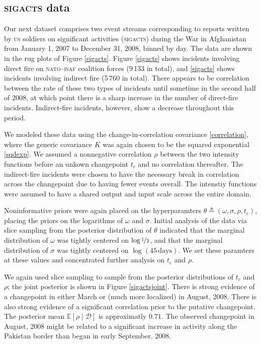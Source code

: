 \documentclass{article}
\newcommand{\deq}{\triangleq}
\newcommand{\cm}[1]{\mathcal{#1}}
\newcommand{\data}{\cm{D}}
\newcommand{\given}{\mid}
\begin{document}
\subsection{\textsc{sigacts} data}

Our next dataset comprises two event streams corresponding to reports
written by \textsc{us} soldiers on significant activities
(\textsc{sigacts}) during the War in Afghanistan from January 1, 2007
to December 31, 2008, binned by day.  The data are shown in the rug
plots of Figure \ref{sigacts}.  Figure \ref{sigacts}
shows incidents involving direct fire on \textsc{nato}--\textsc{isaf}
coalition forces (9\,133 in total), and \ref{sigacts}
shows incidents involving indirect fire (5\,760 in total).  There
appears to be correlation between the rate of these two types of
incidents until sometime in the second half of 2008, at which point
there is a sharp increase in the number of direct-fire incidents.
Indirect-fire incidents, however, show a decrease throughout this
period.

We modeled these data using the change-in-correlation covariance
\eqref{correlation}, where the generic covariance $K$ was again chosen
to be the squared exponential \eqref{sqdexp}. We assumed a nonnegative
correlation $\rho$ between the two intensity functions before an
unkown changepoint $t_c$ and no correlation thereafter.  The
indirect-fire incidents were chosen to have the necessary break in
correlation across the changepoint due to having fewer events overall.
The intenstiy functions were assumed to have a shared output and input
scale across the entire domain.

Noninformative priors were again placed on the hyperparamters $\theta
\deq (\omega, \sigma, \rho, t_c)$, placing the priors on the
logarithms of $\omega$ and $\sigma$. Initial analysis of the data via
slice sampling from the posterior distribution of $\theta$ indicated
that the marginal distribution of $\omega$ was tightly centered on
$\log \nicefrac{1}{2}$, and that the marginal distribution of $\sigma$
was tightly centered on $\log(45\, \text{days})$.  We set these
paramters at these values and concentrated further analysis on $t_c$
and $\rho$.

We again used slice sampling to sample from the posterior
distributions of $t_c$ and $\rho$; the joint posterior is shown in
Figure \ref{sigactsjoint}.  There is strong evidence of a changepoint
in either March or (much more localized) in August, 2008.  There is
also strong evidence of a significant correlation prior to the
putative changepoint.  The posterior mean $\mathbb{E}[\rho \given
  \data]$ is approximatly $0.71$.  The observed changepoint in August,
2008 might be related to a significant increase in activity along
the Pakistan border than began in early September, 2008.
\end{document}
